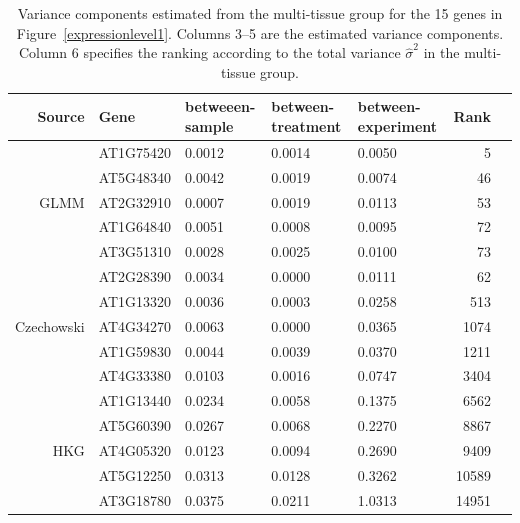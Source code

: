 \documentclass[letterpaper,12pt]{article}
\begin{document}
\begin{table}[]
	\centering
	\caption{Variance components estimated from the multi-tissue group for
	the 15 genes in Figure~\ref{expressionlevel1}.
	Columns 3--5 are the estimated
	variance components. Column 6 specifies the ranking according to the
	total variance $\hat{\sigma}^2$ in the multi-tissue group.}
	\label{table:15genes}
	\begin{tabular}{rp{2cm}p{2cm}p{2cm}p{2cm}rp{1cm}}\\ \hline
		Source                        & Gene      & betweeen-sample & between-treatment & between-experiment & Rank  \\  \hline
		\multirow{5}{*}{GLMM}   
		 & AT1G75420 & 0.0012 & 0.0014 & 0.0050 & 5 \\ 
		  & AT5G48340 & 0.0042 & 0.0019 & 0.0074 & 46 \\ 
		  & AT2G32910 & 0.0007 & 0.0019 & 0.0113 & 53 \\ 
		  & AT1G64840 & 0.0051 & 0.0008 & 0.0095 & 72 \\ 
		  & AT3G51310 & 0.0028 & 0.0025 & 0.0100 & 73 \\ \hline
	 
	\multirow{5}{*}{Czechowski}  & AT2G28390 & 0.0034 & 0.0000 & 0.0111 & 62 \\ 
			   & AT1G13320 & 0.0036 & 0.0003 & 0.0258 & 513 \\ 
				& AT4G34270 & 0.0063 & 0.0000 & 0.0365 & 1074 \\ 
				 & AT1G59830 & 0.0044 & 0.0039 & 0.0370 & 1211 \\ 
				 & AT4G33380 & 0.0103 & 0.0016 & 0.0747 & 3404 \\ \hline
				 
	 \multirow{5}{*}{HKG}    & AT1G13440 & 0.0234 & 0.0058 & 0.1375 & 6562 \\ 
		 & AT5G60390 & 0.0267 & 0.0068 & 0.2270 & 8867 \\ 
		 & AT4G05320 & 0.0123 & 0.0094 & 0.2690 & 9409 \\ 
		 & AT5G12250 & 0.0313 & 0.0128 & 0.3262 & 10589 \\ 
		 & AT3G18780 & 0.0375 & 0.0211 & 1.0313 & 14951 \\ \hline 
	\end{tabular}
\end{table}

\end{document}
